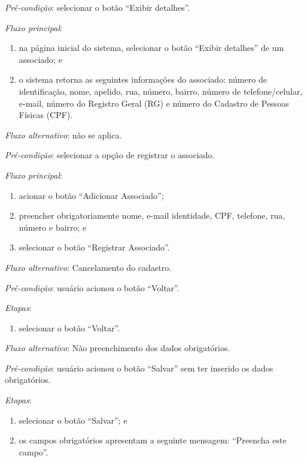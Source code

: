 \noindent \textit{Pré-condição}: selecionar o botão ``Exibir detalhes''.

\noindent \textit{Fluxo principal}:

\begin{enumerate}
    \item na página inicial do sistema, selecionar o botão ``Exibir detalhes'' de um associado; e
    \item o sistema retorna as seguintes informações do associado: número de identificação, nome, apelido, rua, número, bairro, número de telefone/celular, e-mail, número do Registro Geral (RG) e número do Cadastro de Pessoas Físicas (CPF).
\end{enumerate}

\noindent \textit{Fluxo alternativo}: não se aplica.


\vspace{0.7cm}

\noindent \textit{Pré-condição}: selecionar a opção de registrar o associado.

\noindent \textit{Fluxo principal}:

\begin{enumerate}
    \item acionar o botão ``Adicionar Associado'';
    \item preencher obrigatoriamente nome, e-mail identidade, CPF, telefone, rua, número e bairro; e
    \item selecionar o botão ``Registrar Associado''.
\end{enumerate}

\noindent \textit{Fluxo alternativo}: Cancelamento do cadastro.

\noindent \textit{Pré-condição}: usuário acionou o botão ``Voltar''.

\noindent \textit{Etapas}:

\begin{enumerate}
    \item selecionar o botão ``Voltar''.
\end{enumerate}

\noindent \textit{Fluxo alternativo}: Não preenchimento dos dados obrigatórios.

\noindent \textit{Pré-condição}: usuário acionou o botão ``Salvar'' sem ter inserido os dados obrigatórios.

\noindent \textit{Etapas}:

\begin{enumerate}
    \item selecionar o botão ``Salvar''; e
    \item os campos obrigatórios apresentam a seguinte mensagem: ``Preencha este campo''.
\end{enumerate}


